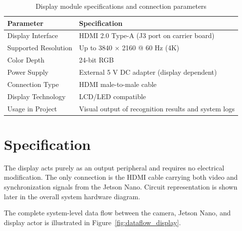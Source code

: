 \begin{table}[H]
	\centering
	\caption{Display module specifications and connection parameters \cite{seeedJ101Manual, jetson_nano_doc}}
	\label{tab:display_specs}
	\begin{tabular}{|p{5cm}|p{8cm}|}
		\hline
		\textbf{Parameter} & \textbf{Specification} \\ \hline
		Display Interface & HDMI 2.0 Type-A (J3 port on carrier board) \\ \hline
		Supported Resolution & Up to 3840 × 2160 @ 60 Hz (4K) \\ \hline
		Color Depth & 24-bit RGB \\ \hline
		Power Supply & External 5 V DC adapter (display dependent) \\ \hline
		Connection Type & HDMI male-to-male cable \\ \hline
		Display Technology & LCD/LED compatible \\ \hline
		Usage in Project & Visual output of recognition results and system logs \\ \hline
	\end{tabular}
\end{table}

\section{Specification}
The display acts purely as an output peripheral and requires no electrical modification.  
The only connection is the HDMI cable carrying both video and synchronization signals from the Jetson Nano.  
Circuit representation is shown later in the overall system hardware diagram.

The complete system-level data flow between the camera, Jetson Nano, and display actor is illustrated in Figure~\ref{fig:dataflow_display}.

